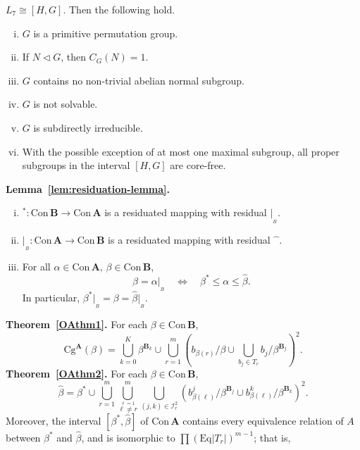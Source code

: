 \documentclass[cm,dissertation,actual,final]{uhthesis}
\theoremstyle{plain}
\theoremstyle{definition}
\theoremstyle{remark}
\numberwithin{theorem}{section}
\numberwithin{claim}{chapter}
\numberwithin{equation}{section}
\numberwithin{conjecture}{chapter}
\newcommand{\<}{\ensuremath{\langle}}
\renewcommand{\>}{\ensuremath{\rangle}}
\renewcommand{\leq}{\ensuremath{\leqslant}}
\newcommand{\ssubnormal}{\ensuremath{\vartriangleleft}}
\newcommand{\Eq}{\ensuremath{\mathrm{Eq}}}
\newcommand{\Cg}{\ensuremath{\mathrm{Cg}}}
\newcommand{\Con}{\ensuremath{\mathrm{Con\,}}}
\newcommand{\0}{\ensuremath{\mathbf{0}}}
\newcommand{\1}{\ensuremath{\mathbf{1}}}
\newcommand{\2}{\ensuremath{\mathbf{2}}}
\newcommand{\3}{\ensuremath{\mathbf{3}}}
\newcommand{\4}{\ensuremath{\mathbf{4}}}
\newcommand{\5}{\ensuremath{\mathbf{5}}}
\newcommand{\bA}{\ensuremath{\mathbf{A}}}
\newcommand{\bB}{\ensuremath{\mathbf{B}}}
\newcommand{\sI}{\ensuremath{\mathscr{I}}}
\newcommand{\resB}{\ensuremath{|_{_B}}}
\newcommand{\hatmap}{\ensuremath{\widehat{\phantom{x}}}}
\newcommand{\hbeta}{\ensuremath{\widehat{\beta}}}
\begin{document}
$L_7 \cong [H,G]$.  Then the following hold.
\begin{enumerate}[(i)]
\item $G$ is a primitive permutation group.
\item If $N\ssubnormal G$, then $C_G(N) = 1$.
\item $G$ contains no non-trivial abelian normal subgroup.
\item $G$ is not solvable.
\item $G$ is subdirectly irreducible.
\item With the possible exception of at most one maximal subgroup,
  all proper subgroups in the interval $[H,G]$ are core-free. 
\end{enumerate}
\vskip4mm \noindent
{\bf Lemma~\ref{lem:residuation-lemma}.}
  ~
  \begin{enumerate}[(i)]
  \item $^*: \Con\bB \rightarrow \Con\bA$ is a residuated mapping with
    residual $\resB$.
  \item $\resB : \Con\bA \rightarrow \Con\bB$ is a residuated mapping with
    residual $\hatmap$.
  \item For all $\alpha \in \Con\bA, \, \beta \in \Con\bB$,
    \[
    \beta = \alpha\resB \quad \Leftrightarrow  \quad 
    \beta^* \leq \alpha \leq \widehat{\beta}.
    \]
    In particular, 
    $\beta^*\resB = \beta = \widehat{\beta}\resB$.
  \end{enumerate}
\vskip4mm \noindent
{\bf Theorem~\ref{OAthm1}.}
  For each $\beta \in \Con \bB$, 
  \begin{equation*}
    \Cg^\bA(\beta) = \bigcup_{k=0}^K \beta^{\bB_k} \cup \bigcup_{r=1}^m 
    \left(b_{\beta(r)}/\beta \cup \bigcup_{b_j\in T_r} b_j/\beta^{\bB_j}\right)^2.
  \end{equation*}
\vskip4mm \noindent
{\bf Theorem~\ref{OAthm2}.}
  For each $\beta \in \Con \bB$, 
  \begin{equation*}
    \widehat{\beta} = 
    \beta^* \cup 
    \bigcup_{r=1}^m
    \bigcup^m_{\stackrel{\ell=1}{\ell \neq r}}
    \bigcup_{(j,k) \in \sI_r^2}
    \left(b^j_{\beta(\ell)}/\beta^{\bB_j} \cup b^k_{\beta(\ell)}/\beta^{\bB_k}\right)^2.
  \end{equation*}
  Moreover, the interval $[\beta^*, \widehat{\beta}]$ of $\Con\bA$ 
  contains every equivalence relation of $A$ between $\beta^*$ and $\hbeta$, and
  is isomorphic to $\prod (\Eq |T_r|)^{m-1}$; that is,
\end{document}
